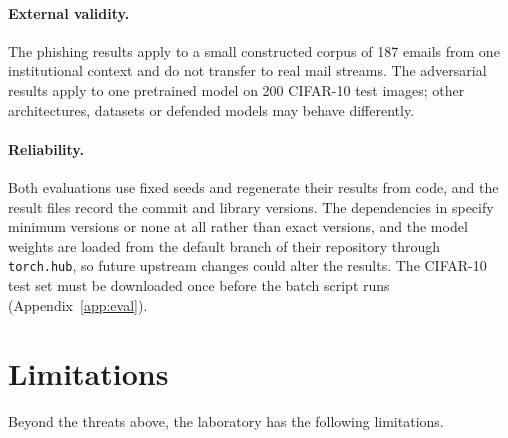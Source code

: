 \paragraph{External validity.} The phishing results apply to a small constructed corpus of 187 emails from one institutional context and do not transfer to real mail streams. The adversarial results apply to one pretrained model on 200 CIFAR-10 test images; other architectures, datasets or defended models may behave differently.

\paragraph{Reliability.} Both evaluations use fixed seeds and regenerate their results from code, and the result files record the commit and library versions. The dependencies in  specify minimum versions or none at all rather than exact versions, and the model weights are loaded from the default branch of their repository through \texttt{torch.hub}, so future upstream changes could alter the results. The CIFAR-10 test set must be downloaded once before the batch script runs (Appendix~\ref{app:eval}).

\section{Limitations}
\label{sec:limits-disc}

Beyond the threats above, the laboratory has the following limitations.

